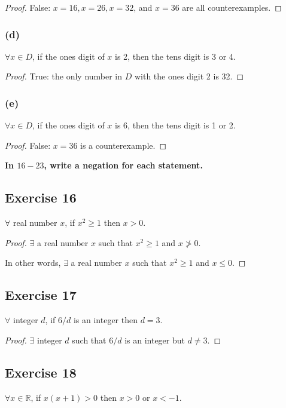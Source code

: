 \documentclass[14pt]{extarticle}
\newcommand{\R}{\mathbb{R}}
\newcommand{\fa}{\forall}
\newcommand{\te}{\exists}
\begin{document}
\begin{proof}
    False: $x = 16, x = 26, x = 32$, and $x = 36$ are all
    counterexamples.
\end{proof}

\subsubsection{(d)}
$\fa x \in D$, if the ones digit of $x$ is 2, then the tens digit is 3 or 4.

\begin{proof}
    True: the only number in $D$ with the ones digit 2 is 32.
\end{proof}

\subsubsection{(e)}
$\fa x \in D$, if the ones digit of $x$ is 6, then the tens digit is 1 or 2.

\begin{proof}
    False: $x = 36$ is a counterexample.
\end{proof}

{\bf \color{cyan} In $16-23$, write a negation for each statement.}

\subsection{Exercise 16}
$\fa$ real number $x$, if $x^2 \geq 1$ then $x > 0$.

\begin{proof}
    $\te$ a real number $x$ such that $x^2 \geq 1$ and $x \ngtr 0$.

    In other words, $\te$ a real number $x$ such that $x^2 \geq 1$ and $x \leq 0$.
\end{proof}

\subsection{Exercise 17}
$\fa$ integer $d$, if $6 / d$ is an integer then $d = 3$.

\begin{proof}
    $\te$ integer $d$ such that $6 / d$ is an integer but $d \neq 3$.
\end{proof}

\subsection{Exercise 18}
$\fa x \in \R$, if $x(x + 1) > 0$ then $x > 0$ or $x < -1$.
\end{document}
